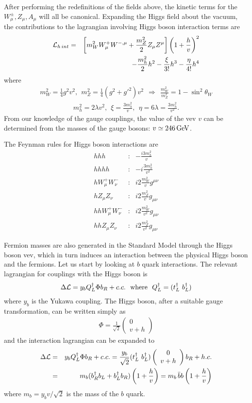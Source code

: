 \documentclass[12pt]{article}
\def\beq{\begin{eqnarray}}
\def\eeq{\end{eqnarray}}
\def\bea{\begin{eqnarray}}
\def\eea{\end{eqnarray}}
\def\gev{\, {\rm GeV}}
\begin{document}
After performing the redefinitions of the fields above, the kinetic terms for the $W^\pm_\mu, Z_\mu, A_\mu$ will all be canonical. Expanding the Higgs field about the vacuum, the contributions to the lagrangian involving Higgs boson interaction terms are
\bea
{\cal L}_{h\, int}& = &\left[ m_W^2W^+_\mu W^{-,\mu}+\frac{m_Z^2}{2}Z_\mu Z^\mu\right]  \left( 1+\frac{h}{v}\right)^2 \\
& & -\frac{m_h^2}{2}h^2-\frac{\xi}{3!}h^3-\frac{\eta}{4!} h^4
\eea
where
\beq
m^2_W=\frac{1}{4}g^2v^2,~~m_Z^2=\frac{1}{4}(g^2+g'^2)v^2~~\Longrightarrow~~
\frac{m_W^2}{m^2_Z}=1-\sin^2\theta_W
\eeq
\beq
m^2_h=2\lambda v^2,~~\xi=\frac{3m^2_h}{v},~~\eta=6\lambda=\frac{3m^2_h}{v^2}.
\eeq
From our knowledge of the gauge couplings, the value of the vev $v$ can be determined from the masses of the gauge bosons: $v\simeq 246\gev$.

The Feynman rules for Higgs boson interactions are
\bea
hhh & : & -\frac{i3m^2_h}{v} \\
hhhh & : & -i\frac{3m^2_h}{v^2} \\
hW^+_\mu W^-_\nu & : & i2\frac{m^2_W}{v}g^{\mu\nu} \\
hZ_\mu Z_\nu & : & i2\frac{m_Z^2}{v}g_{\mu\nu} \\
hhW^+_\mu W^-_\nu & : & i2\frac{m_W^2}{v^2}g_{\mu\nu} \\
hhZ_\mu Z_\nu & : & i2\frac{m_Z^2}{v^2}g_{\mu\nu}
\eea

Fermion masses are also generated in the Standard Model through the Higgs boson vev, which in turn induces an interaction between the physical Higgs boson and the fermions. Let us start by looking at $b$ quark interactions. The relevant lagrangian for couplings with the Higgs boson is
\beq
\Delta {\cal L}=y_b Q^\dagger_L \Phi b_R+c.c.~~{\rm where}~~Q^\dagger_L=(t^\dagger_L ~ b^\dagger_L)
\eeq
where $y_b$ is  the Yukawa coupling. The Higgs boson, after a suitable gauge transformation, can be written simply as
\beq
\Phi=\frac{1}{\sqrt{2}}\left( \begin{array}{c} 0 \\ v+h \end{array}\right)
\eeq
and the interaction lagrangian can be expanded to 
\bea
\Delta{\cal L} &=&y_bQ^\dagger_L \Phi b_R+c.c.=\frac{y_b}{\sqrt{2}}(t^\dagger_L~b^\dagger_L)
\left( \begin{array}{c} 0 \\ v+h \end{array}\right)b_R+h.c. \\
& = & m_b(b^\dagger_R b_L+b^\dagger_L b_R)\left( 1+\frac{h}{v}\right)=
m_b\, \bar b b\left( 1+\frac{h}{v}\right)
\eea
where $m_b=y_bv/\sqrt{2}$ is the  mass of the $b$ quark. 
\end{document}
